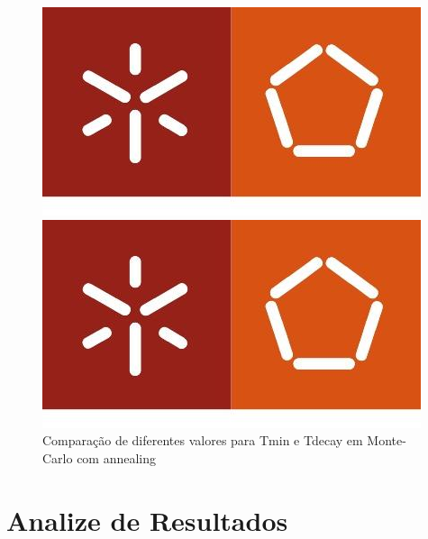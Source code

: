 \documentclass[a4paper]{report}
\begin{document}
\begin{figure}[h]
\centering
\begin{minipage}{.5\textwidth}
  \centering
  \includegraphics[width=.95\linewidth]{images/eng.jpeg}
\end{minipage}%
\begin{minipage}{.5\textwidth}
  \centering
  \includegraphics[width=.95\linewidth]{images/eng.jpeg}
\end{minipage}
    \caption{Comparação de diferentes valores para Tmin e Tdecay em Monte-Carlo com annealing}
\end{figure}

\chapter{Analize de Resultados}
\end{document}
